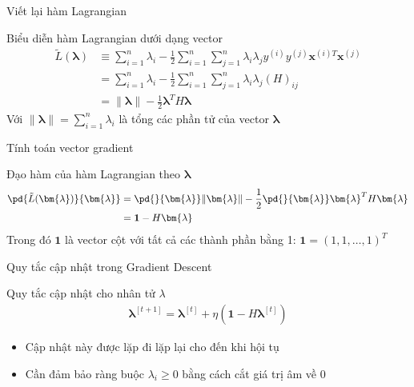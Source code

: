\documentclass[serif, aspectratio=169]{beamer}
\begin{document}
	\begin{frame}{Viết lại hàm Lagrangian}
		\begin{block}{Biểu diễn hàm Lagrangian dưới dạng vector}
			\begin{align*}
				\tilde{L}(\bm{\lambda}) &\equiv \sum_{i=1}^n \lambda_i - \frac{1}{2}\sum_{i=1}^n \sum_{j=1}^n \lambda_i \lambda_j y^{(i)}y^{(j)}\mathbf{x}^{(i)T}\mathbf{x}^{(j)} \\
				&= \sum_{i=1}^n \lambda_i - \frac{1}{2}\sum_{i=1}^n \sum_{j=1}^n \lambda_i \lambda_j (H)_{ij} \\
				&= \| \bm{\lambda} \| - \frac{1}{2}\bm{\lambda}^T H \bm{\lambda}
			\end{align*}
			Với $\| \bm{\lambda} \| = \sum_{i=1}^n \lambda_i$ là tổng các phần tử của vector $\bm{\lambda}$
		\end{block}
	\end{frame}
	
	\begin{frame}{Tính toán vector gradient}
		\begin{block}{Đạo hàm của hàm Lagrangian theo $\bm{\lambda}$}
			\begin{align*}
				\pd{\tilde{L}(\bm{\lambda})}{\bm{\lambda}} &= \pd{}{\bm{\lambda}} \| \bm{\lambda} \| - \frac{1}{2} \pd{}{\bm{\lambda}} \bm{\lambda}^T H \bm{\lambda} \\
				&= \mathbf{1} - H \bm{\lambda}
			\end{align*}
			Trong đó $\mathbf{1}$ là vector cột với tất cả các thành phần bằng 1:
			$\mathbf{1} = (1, 1, \ldots, 1)^T$
		\end{block}
	\end{frame}
	
	\begin{frame}{Quy tắc cập nhật trong Gradient Descent}
		\begin{block}{Quy tắc cập nhật cho nhân tử $\lambda$}
			\begin{align*}
				\bm{\lambda}^{[t+1]} = \bm{\lambda}^{[t]} + \eta(\mathbf{1} - H\bm{\lambda}^{[t]})
			\end{align*}
		\end{block}
		\begin{itemize}
			\item Cập nhật này được lặp đi lặp lại cho đến khi hội tụ
			\item Cần đảm bảo ràng buộc $\lambda_i \geq 0$ bằng cách cắt giá trị âm về 0
		\end{itemize}
	\end{frame}
\end{document}
